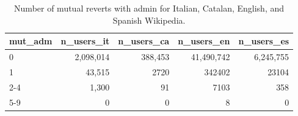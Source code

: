 \begin{table}[H]
    \centering
    \begin{tabularx}{\columnwidth}{@{}Xrrrr@{}}
        \midrule
        \textbf{mut\_adm} & \textbf{n\_users\_it} & \textbf{n\_users\_ca}& \textbf{n\_users\_en} & \textbf{n\_users\_es}  \\ \toprule
        0 & 2,098,014& 388,453 & 41,490,742& 6,245,755\\
        1   & 43,515& 2720 & 342402& 23104\\
        2-4 & 1,300& 91 & 7103& 358\\
        5-9 & 0& 0 & 8 & 0\\
     
        \bottomrule
    \end{tabularx}
    
    \caption{Number of mutual reverts with admin for Italian, Catalan, English, and Spanish Wikipedia. \label{table:mutadmbin}}
\end{table}
\clearpage
